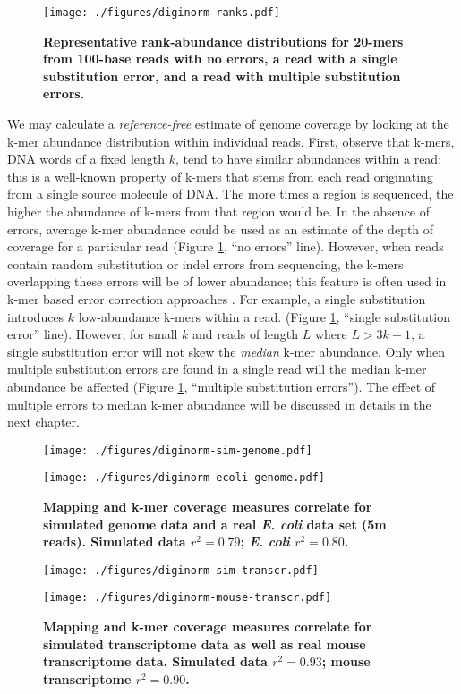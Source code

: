 \begin{figure}[!ht]
\centerline{\texttt{[image: ./figures/diginorm-ranks.pdf]}} \caption{ {\bf
Representative rank-abundance distributions for 20-mers from 100-base reads
with no errors, a read with a single substitution error, and a read with
multiple substitution errors.}} \label{fig:rankabund} \end{figure}

We may calculate a {\em reference-free} estimate of genome coverage by looking
at the k-mer abundance distribution within individual reads. First, observe
that k-mers, DNA words of a fixed length $k$, tend to have similar abundances
within a read: this is a well-known property of k-mers that stems from each
read originating from a single source molecule of DNA.  The more times a region
is sequenced, the higher the abundance of k-mers from that region would be.  In
the absence of errors, average k-mer abundance could be used as an estimate of
the depth of coverage for a particular read (Figure \ref{fig:rankabund}, ``no
errors'' line).  However, when reads contain random substitution or indel
errors from sequencing, the k-mers overlapping these errors will be of lower
abundance; this feature is often used in k-mer based error correction
approaches \cite{Kelley2010}.  For example, a single substitution 
introduces $k$ low-abundance k-mers within a read.  (Figure \ref{fig:rankabund},
``single substitution error'' line).  However, for small $k$ and reads of
length $L$ where $L > 3k-1$, a single substitution error will not skew the {\em
median} k-mer abundance.  Only when multiple substitution errors are found in a
single read will the median k-mer abundance be affected (Figure
\ref{fig:rankabund}, ``multiple substitution errors''). The effect of multiple
errors to median k-mer abundance will be discussed in details in the next chapter.


\begin{figure}[!ht] \begin{center}
\centerline{\texttt{[image: ./figures/diginorm-sim-genome.pdf]}}
\centerline{\texttt{[image: ./figures/diginorm-ecoli-genome.pdf]}}
\end{center} \caption{ {\bf Mapping and k-mer coverage measures correlate for
simulated genome data and a real {\em E. coli} data set (5m reads).  Simulated
data $r^2 = 0.79$; {\em E. coli} $r^2 = 0.80$.}
}
\label{fig:random} \end{figure}


\begin{figure}[!ht] \begin{center}
\centerline{\texttt{[image: ./figures/diginorm-sim-transcr.pdf]}}
\centerline{\texttt{[image: ./figures/diginorm-mouse-transcr.pdf]}}
\end{center} \caption{ {\bf Mapping and k-mer coverage measures correlate for
simulated transcriptome data as well as real mouse transcriptome data.
Simulated data $r^2 = 0.93$; mouse transcriptome $r^2 = 0.90$.}
}
\label{fig:transcripts} \end{figure}


